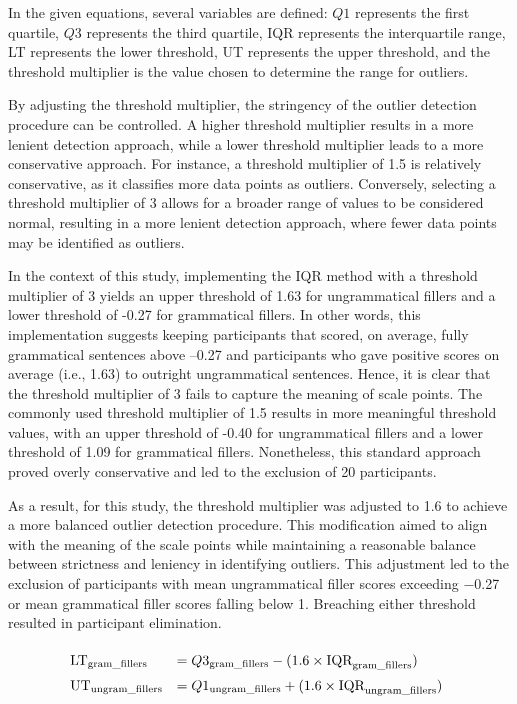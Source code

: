 In the given equations, several variables are defined: $Q1$ represents the first quartile, $Q3$ represents the third quartile, IQR represents the interquartile range, LT represents the lower threshold, UT represents the upper threshold, and the threshold multiplier is the value chosen to determine the range for outliers.

By adjusting the threshold multiplier, the stringency of the outlier detection procedure can be controlled. A higher threshold multiplier results in a more lenient detection approach, while a lower threshold multiplier leads to a more conservative approach. For instance, a threshold multiplier of 1.5 is relatively conservative, as it classifies more data points as outliers. Conversely, selecting a threshold multiplier of 3 allows for a broader range of values to be considered normal, resulting in a more lenient detection approach, where fewer data points may be identified as outliers.


In the context of this study, implementing the IQR method with a threshold multiplier of 3 yields an upper threshold of 1.63 for ungrammatical fillers and a lower threshold of -0.27 for grammatical fillers. In other words, this implementation suggests keeping participants that scored, on average, fully grammatical sentences above --0.27 and participants who gave positive scores on average (i.e., 1.63) to outright ungrammatical sentences. Hence, it is clear that the threshold multiplier of 3 fails to capture the meaning of scale points. The commonly used threshold multiplier of 1.5 results in more meaningful threshold values, with an upper threshold of -0.40 for ungrammatical fillers and a lower threshold of 1.09 for grammatical fillers. Nonetheless, this standard approach proved overly conservative and led to the exclusion of 20 participants.

\begin{sloppypar}
As a result, for this study, the threshold multiplier was adjusted to 1.6 to achieve a more balanced outlier detection procedure. This modification aimed to align with the meaning of the scale points while maintaining a reasonable balance between strictness and leniency in identifying outliers. This adjustment led to the exclusion of participants with mean ungrammatical filler scores exceeding $-$0.27 or mean grammatical filler scores falling below 1. Breaching either threshold resulted in participant elimination. 
\end{sloppypar}

\pex
\vspace{-1.4em}
\begin{equation*}
	\renewcommand\arraystretch{1.5}
	\begin{array}{@{}ll}
		\text{LT}_{\text{gram\_fillers}}  & = Q3_{\text{gram\_fillers}} - (1.6 \times \text{IQR}_{\text{gram\_fillers}}) \\
		\text{UT}_{\text{ungram\_fillers}} & = Q1_{\text{ungram\_fillers}} + (1.6 \times \text{IQR}_{\text{ungram\_fillers}}) \\
	\end{array}
\end{equation*}
\xe


